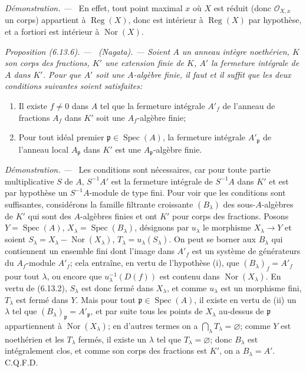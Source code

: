 \documentclass[10pt,oneside]{book}
\newcommand{\oldpage}[2][]{%
  \setcounter{footnote}{0}%
  \marginpar{\scriptsize\textbf{#1}~|~#2}\ignorespaces}
\newenvironment{proposition}[1][]{%
  \par\medskip\noindent\itshape Proposition (#1). ---\ }{\par}
\newenvironment{proof}{%
  \par\medskip\noindent\textit{Démonstration. ---\ }}{\par}
\begin{document}
\begin{proof}
En effet, tout point maximal $x$ où $X$ est réduit (donc
$\mathcal O_{X,x}$ un corps) appartient à $\operatorname{Reg}(X)$, donc est
intérieur à $\operatorname{Reg}(X)$ par hypothèse, et a fortiori est
intérieur à $\operatorname{Nor}(X)$.
\end{proof}

\begin{proposition}[6.13.6]
\label{IV.2.s6.13.6-fr}
\textnormal{(Nagata).} --- Soient $A$ un anneau intègre noethérien, $K$ son
corps des fractions, $K'$ une extension finie de $K$, $A'$ la fermeture
intégrale de $A$ dans $K'$. Pour que $A'$ soit une $A$-algèbre finie, il
faut et il suffit que les deux conditions suivantes soient satisfaites:
\begin{enumerate}
\item[(i)] Il existe $f\neq0$ dans $A$ tel que la fermeture intégrale $A'_f$
de l'anneau de fractions $A_f$ dans $K'$ soit une $A_f$-algèbre finie;
\item[(ii)] Pour tout idéal premier $\mathfrak p\in\operatorname{Spec}(A)$,
la fermeture intégrale $A'_\mathfrak p$ de l'anneau local $A_\mathfrak p$
dans $K'$ est une $A_\mathfrak p$-algèbre finie.
\end{enumerate}
\end{proposition}

\begin{proof}
Les conditions sont nécessaires, car pour toute partie multiplicative $S$
de $A$, $S^{-1}A'$ est la fermeture intégrale de $S^{-1}A$ dans $K'$ et est
par hypothèse un $S^{-1}A$-module de type fini. Pour voir que les conditions
sont suffisantes, considérons la famille filtrante croissante $(B_\lambda)$
des sous-$A$-algèbres de $K'$ qui sont des $A$-algèbres finies et ont $K'$
pour corps des fractions. Posons $Y=\operatorname{Spec}(A)$,
$X_\lambda=\operatorname{Spec}(B_\lambda)$, désignons par $u_\lambda$ le
morphisme $X_\lambda\to Y$ et soient
$S_\lambda=X_\lambda-\operatorname{Nor}(X_\lambda)$,
$T_\lambda=u_\lambda(S_\lambda)$. On peut se borner aux $B_\lambda$ qui
contiennent un ensemble fini dont l'image dans $A'_f$ est un système de
générateurs du $A_f$-module $A'_f$; cela entraîne, en vertu de l'hypothèse
(i), que $(B_\lambda)_f=A'_f$ pour tout $\lambda$, ou encore que
$u_\lambda^{-1}(D(f))$ est contenu dans $\operatorname{Nor}(X_\lambda)$. En
vertu de (6.13.2), $S_\lambda$ est donc fermé dans $X_\lambda$, et comme
$u_\lambda$ est un morphisme fini, $T_\lambda$ est fermé dans $Y$. Mais
pour tout $\mathfrak p\in\operatorname{Spec}(A)$, il existe en vertu de
(ii) un $\lambda$ tel que $(B_\lambda)_\mathfrak p=A'_\mathfrak p$, et par
suite tous les points
\oldpage[IV-2]{169}
de $X_\lambda$ au-dessus de $\mathfrak p$ appartiennent à
$\operatorname{Nor}(X_\lambda)$; en d'autres termes on a
$\bigcap_\lambda T_\lambda=\varnothing$; comme $Y$ est noethérien et les
$T_\lambda$ fermés, il existe un $\lambda$ tel que
$T_\lambda=\varnothing$; donc $B_\lambda$ est intégralement clos, et comme
son corps des fractions est $K'$, on a $B_\lambda=A'$. C.Q.F.D.
\end{proof}
\end{document}
